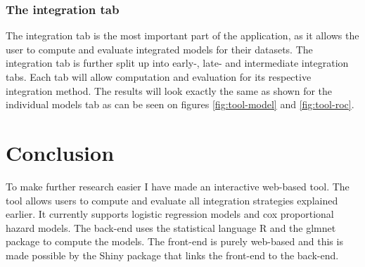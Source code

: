 \subsubsection{The integration tab}
The integration tab is the most important part of the application, as it allows the user to compute and evaluate integrated models for their datasets. The integration tab is further split up into early-, late- and intermediate integration tabs. Each tab will allow computation and evaluation for its respective integration method. The results will look exactly the same as shown for the individual models tab as can be seen on figures \ref{fig:tool-model} and \ref{fig:tool-roc}.

\section{Conclusion}
\label{sec:tool-conclusion}
To make further research easier I have made an interactive web-based tool. The tool allows users to compute and evaluate all integration strategies explained earlier. It currently supports logistic regression models and cox proportional hazard models. The back-end uses the statistical language R and the glmnet package to compute the models. The front-end is purely web-based and this is made possible by the Shiny package that links the front-end to the back-end.
